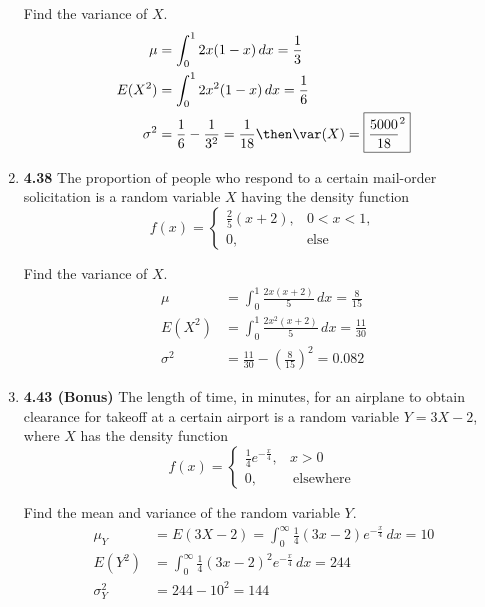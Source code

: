 \documentclass[basic, header]{nosvagor-notes}
\begin{document}
\begin{enumerate}[leftmargin=1.5em, itemsep=2em]
    Find the variance of \(X\).
    \begin{align*}
      \mu &= \int_{0}^{1} 2x(1-x)\, dx = \frac{1}{3} \\
      E(X^2) &= \int_{0}^{1} 2x^2(1-x)\, dx = \frac{1}{6} \\
      \sigma^2 &= \frac{1}{6} - \frac{1}{3^2} = \frac{1}{18}
      \then \var(X) = \boxed{\frac{5000}{18}^2}
    \end{align*}

  \newpage %

  \item \textbf{4.38} The proportion of people who respond to a certain
    mail-order solicitation is a random variable \(X\) having the density
    function
    \[%
      f(x) =
      \begin{cases}
        \frac{2}{5}(x+2),			& 0<x<1, \\
        0, & \text{else}
      \end{cases}
    \]%

    Find the variance of \(X\).
    \begin{align*}
      \mu &= \int_{0}^{1} \frac{2x(x+2)}{5}\, dx = \frac{8}{15}\\
      E(X^2) &= \int_{0}^{1} \frac{2x^2(x+2)}{5}\, dx = \frac{11}{30}\\
      \sigma^2 &= \frac{11}{30} - \left(\frac{8}{15}\right)^2 = \boxed{0.082}
    \end{align*}


  \item \textbf{4.43 (Bonus)} The length of time, in minutes, for an airplane
    to obtain clearance for takeoff at a certain airport is a random variable
    \(Y = 3X - 2\), where \(X\) has the density function
    \[%
      f(x) =
      \begin{cases}
        \frac{1}{4}e^{-\frac{x}{4}}, & x > 0 \\
        0, & ~\text{elsewhere}~
      \end{cases}
    \]%

    Find the mean and variance of the random variable \(Y\).
    \begin{align*}
      \mu_Y &= E(3X - 2 ) =
      \int_{0}^{\infty} \frac{1}{4}(3x - 2)e^{-\frac{x}{4}}\, dx = 10 \\
      E(Y^2) &= \int_{0}^{\infty} \frac{1}{4}(3x - 2)^2e^{-\frac{x}{4}}\, dx = 244 \\
      \sigma_Y^2 &= 244 - 10^2 = \boxed{144}
    \end{align*}


\end{enumerate}
\end{document}
